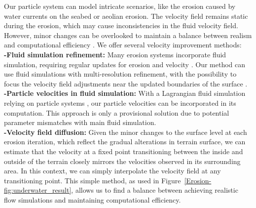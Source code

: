 Our particle system can model intricate scenarios, like the erosion caused by water currents on the seabed or aeolian erosion. The velocity field remains static during the erosion, which may cause inconsistencies in the fluid velocity field. However, minor changes can be overlooked to maintain a balance between realism and computational efficiency \cite{Tychonievich2010}. We offer several velocity improvement methods: \\
\textbf{-Fluid simulation refinement:} Many erosion systems incorporate fluid simulation, requiring regular updates for erosion and velocity \cite{Kristof2009, Wojtan2007}. Our method can use fluid simulations with multi-resolution refinement, with the possibility to focus the velocity field adjustments near the updated boundaries of the surface \cite{Roose2011}. \\
\textbf{-Particle velocities in fluid simulation:} With a Lagrangian fluid simulation relying on particle systems \cite{Koschier2022}, our particle velocities can be incorporated in its computation. This approach is only a provisional solution due to potential parameter mismatches with main fluid simulation. \\
\textbf{-Velocity field diffusion:} Given the minor changes to the surface level at each erosion iteration, which reflect the gradual alterations in terrain surface, we can estimate that the velocity at a fixed point transitioning between the inside and outside of the terrain closely mirrors the velocities observed in its surrounding area. In this context, we can simply interpolate the velocity field at any transitioning point. This simple method, as used in Figure~\ref{Erosion-fig:underwater_result}, allows us to find a balance between achieving realistic flow simulations and maintaining computational efficiency.
